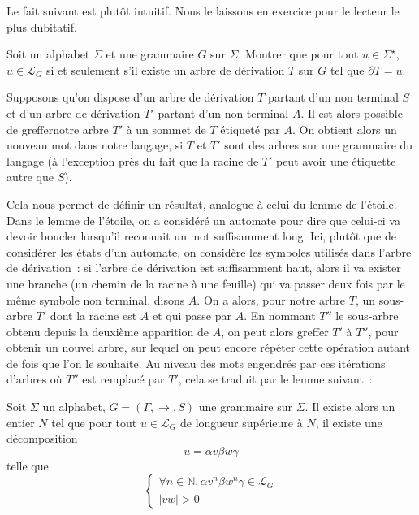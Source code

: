 Le fait suivant est plutôt intuitif. Nous le laissons en exercice pour le
lecteur le plus dubitatif.

\begin{exercise}
  Soit un alphabet $\Sigma$ et une grammaire $G$ sur $\Sigma$. Montrer que
  pour tout $u \in \Sigma^\star$, $u \in \mathcal L_G$ si et seulement s'il
  existe un arbre de dérivation $T$ sur $G$ tel que $\partial T = u$.
\end{exercise}

Supposons qu'on dispose d'un arbre de dérivation $T$ partant d'un non terminal
$S$ et d'un arbre de dérivation $T'$ partant d'un non terminal $A$. Il est alors
possible de \og greffer\fg notre arbre $T'$ à un sommet de $T$ étiqueté par $A$.
On obtient alors un nouveau mot dans notre langage, si $T$ et $T'$ sont des
arbres sur une grammaire du langage (à l'exception près du fait que la racine
de $T'$ peut avoir une étiquette autre que $S$).

Cela nous permet de définir un résultat, analogue à celui du lemme de l'étoile.
Dans le lemme de l'étoile, on a considéré un automate pour dire que celui-ci va
devoir boucler lorsqu'il reconnait un mot suffisamment long. Ici, plutôt que de
considérer les états d'un automate, on considère les symboles utilisés dans
l'arbre de dérivation~: si l'arbre de dérivation est suffisamment haut, alors
il va exister une branche (un chemin de la racine à une feuille) qui va passer
deux fois par le même symbole non terminal, disons $A$. On a alors, pour notre
arbre $T$, un sous-arbre $T'$ dont la racine est $A$ et qui passe par $A$. En
nommant $T''$ le sous-arbre obtenu depuis la deuxième apparition de $A$, on peut
alors greffer $T'$ à $T''$, pour obtenir un nouvel arbre, sur lequel on peut
encore répéter cette opération autant de fois que l'on le souhaite. Au niveau
des mots engendrés par ces itérations d'arbres où $T''$ est remplacé par $T'$,
cela se traduit par le lemme suivant~:

\begin{lemma}[Itération]
  Soit $\Sigma$ un alphabet, $G = (\Gamma,\to,S)$ une grammaire sur $\Sigma$.
  Il existe alors un entier $N$ tel que pour tout $u \in \mathcal L_G$ de
  longueur supérieure à $N$, il existe une décomposition
  \[u = \alpha v \beta w \gamma\]
  telle que
  \[\begin{cases}
  \forall n \in \mathbb N, \alpha v^n \beta w^n \gamma \in \mathcal L_G\\
  |vw| > 0
  \end{cases}\]
\end{lemma}

